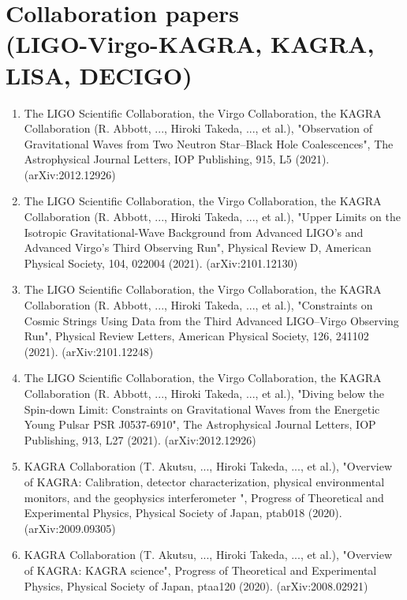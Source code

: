 \documentclass[12pt,a4paper]{article}
\begin{document}
\section*{Collaboration papers \\(LIGO-Virgo-KAGRA, KAGRA, LISA, DECIGO)}
\begin{enumerate}
\item The LIGO Scientific Collaboration, the Virgo Collaboration, the KAGRA Collaboration (R. Abbott, ..., Hiroki Takeda, ..., et al.), "Observation of Gravitational Waves from Two Neutron Star–Black Hole Coalescences", The Astrophysical Journal Letters, IOP Publishing, 915, L5 (2021). (arXiv:2012.12926)

\item The LIGO Scientific Collaboration, the Virgo Collaboration, the KAGRA Collaboration (R. Abbott, ..., Hiroki Takeda, ..., et al.), "Upper Limits on the Isotropic Gravitational-Wave Background from Advanced LIGO's and Advanced Virgo's Third Observing Run", Physical Review D, American Physical Society, 104, 022004 (2021). (arXiv:2101.12130)

\item The LIGO Scientific Collaboration, the Virgo Collaboration, the KAGRA Collaboration (R. Abbott, ..., Hiroki Takeda, ..., et al.), "Constraints on Cosmic Strings Using Data from the Third Advanced LIGO–Virgo Observing Run", Physical Review Letters, American Physical Society, 126, 241102 (2021). (arXiv:2101.12248)

\item The LIGO Scientific Collaboration, the Virgo Collaboration, the KAGRA Collaboration (R. Abbott, ..., Hiroki Takeda, ..., et al.), "Diving below the Spin-down Limit: Constraints on Gravitational Waves from the Energetic Young Pulsar PSR J0537-6910", The Astrophysical Journal Letters, IOP Publishing, 913, L27 (2021). (arXiv:2012.12926)

\item KAGRA Collaboration (T. Akutsu, ..., Hiroki Takeda, ..., et al.), "Overview of KAGRA: Calibration, detector characterization, physical environmental monitors, and the geophysics interferometer ", Progress of Theoretical and Experimental Physics, Physical Society of Japan, ptab018 (2020). (arXiv:2009.09305)

\item KAGRA Collaboration (T. Akutsu, ..., Hiroki Takeda, ..., et al.), "Overview of KAGRA: KAGRA science", Progress of Theoretical and Experimental Physics, Physical Society of Japan, ptaa120 (2020). (arXiv:2008.02921)


\end{enumerate}
\end{document}
